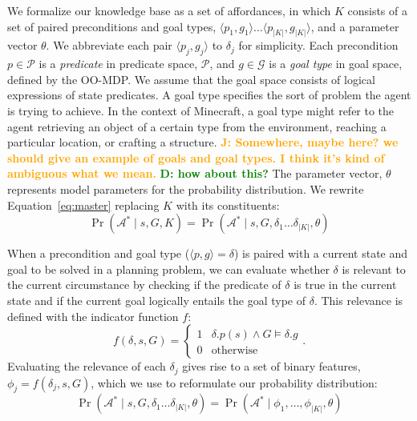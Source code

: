 \documentclass[conference]{IEEEtran}
\newcommand{\dnote}[1]{\textcolor{Green}{\textbf{D: #1}}}
\newcommand{\jnote}[1]{\textcolor{Orange}{\textbf{J: #1}}}
\begin{document}
We formalize our knowledge base as a set of affordances, in which $K$
consists of a set of paired preconditions and goal types, $\langle p_1, g_1 \rangle
\ldots \langle p_{|K|}, g_{|K|} \rangle$, and a parameter vector $\theta$.  We abbreviate
each pair $\langle p_j, g_j \rangle$ to $\delta_j$ for simplicity. Each precondition $p \in \mathcal{P}$
is a {\it predicate} in predicate space, $\mathcal{P}$, and $g \in \mathcal{G}$ is a {\it goal type} in goal space, defined by the OO-MDP. We assume that the goal space consists of logical expressions of state predicates.
A goal type specifies the sort of problem the agent is trying to achieve. In the context of Minecraft,
a goal type might refer to the agent retrieving an object of a certain type from the environment, reaching a particular location, or crafting a structure. \jnote{Somewhere, maybe here? we should give an example of goals and goal types.
I think it's kind of ambiguous what we mean.} \dnote{how about this?}
The parameter vector, $\theta$ represents model parameters for the probability distribution.
We rewrite Equation~\ref{eq:master} replacing $K$ with its constituents:
\begin{equation}
\Pr(\mathcal{A}^* \mid s, G, K) = \Pr(\mathcal{A}^* \mid s, G, \delta_1 \ldots \delta_{|K|}, \theta)
\end{equation}

When a precondition and goal type ($\langle p , g \rangle = \delta$) is paired with a current state and goal to be solved in a planning problem, we can evaluate whether $\delta$ is relevant to the current circumstance by checking if the predicate of $\delta$ is true in the current state and if the current goal logically entails the goal type of $\delta$. This relevance is defined with the indicator function $f$:
\begin{equation}
f(\delta, s, G) = 
\begin{cases}
1& \delta.p(s) \wedge G \models \delta.g \\
0& \text{otherwise}
\end{cases}.
\label{eq:f_func_def}
\end{equation}
Evaluating the relevance of each $\delta_j$ gives rise to a set of binary features, $\phi_j = f(\delta_j, s, G)$, which we use to reformulate our probability distribution:
\begin{equation}
\Pr(\mathcal{A}^* \mid s, G, \delta_1 \ldots \delta_{|K|}, \theta) = \Pr(\mathcal{A}^* \mid \phi_1, \ldots, \phi_{|K|}, \theta)
\label{eq:feature_rep}
\end{equation}
\end{document}
